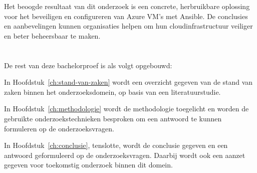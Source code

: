 Het beoogde resultaat van dit onderzoek is een concrete, herbruikbare oplossing voor het beveiligen en configureren van Azure VM's met Ansible.
De conclusies en aanbevelingen kunnen organisaties helpen om hun cloudinfrastructuur veiliger en beter beheersbaar te maken.

\section{}%
\label{sec:opzet-bachelorproef}


De rest van deze bachelorproef is als volgt opgebouwd:

In Hoofdstuk~\ref{ch:stand-van-zaken} wordt een overzicht gegeven van de stand van zaken binnen het onderzoeksdomein, op basis van een literatuurstudie.

In Hoofdstuk~\ref{ch:methodologie} wordt de methodologie toegelicht en worden de gebruikte onderzoekstechnieken besproken om een antwoord te kunnen formuleren op de onderzoeksvragen.


In Hoofdstuk~\ref{ch:conclusie}, tenslotte, wordt de conclusie gegeven en een antwoord geformuleerd op de onderzoeksvragen.
Daarbij wordt ook een aanzet gegeven voor toekomstig onderzoek binnen dit domein.
